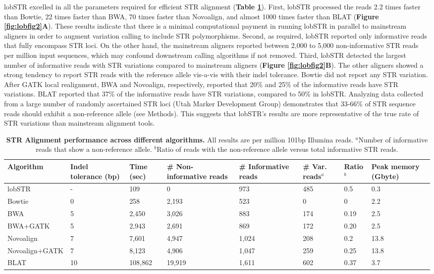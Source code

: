 lobSTR excelled in all the parameters required for efficient STR alignment (\textbf{Table \ref{tab:lobtab1}}). First, lobSTR processed the reads 2.2 times faster than Bowtie, 22 times faster than BWA, 70 times faster than Novoalign, and almost 1000 times faster than BLAT (\textbf{Figure \ref{fig:lobfig2}A}). These results indicate that there is a minimal computational payment in running lobSTR in parallel to mainstream aligners in order to augment variation calling to include STR polymorphisms. Second, as required, lobSTR reported only informative reads that fully encompass STR loci. On the other hand, the mainstream aligners reported between 2,000 to 5,000 non-informative STR reads per million input sequences, which may confound downstream calling algorithms if not removed. Third, lobSTR detected the largest number of informative reads with STR variations compared to mainstream aligners (\textbf{Figure \ref{fig:lobfig2}B}). The other aligners showed a strong tendency to report STR reads with the reference allele vis-a-vis with their indel tolerance. Bowtie did not report any STR variation. After GATK local realignment, BWA and Novoalign, respectively, reported that 20\% and 25\% of the informative reads have STR variations. BLAT reported that 37\% of the informative reads have STR variations, compared to 50\% in lobSTR. Analyzing data collected from a large number of randomly ascertained STR loci \cite{PayseurJingHaasl2011} (Utah Marker Development Group) demonstrates that 33-66\% of STR sequence reads should exhibit a non-reference allele (see Methods). This suggests that lobSTR's results are more representative of the true rate of STR variations than mainstream alignment tools.

\begin{table}[h!]
\centering
\label{tab:lobtab1}
\begin{adjustbox}{width=1\textwidth}
\begin{tabular}{l l l l l l l l}
\hline
Algorithm & Indel tolerance (bp) & Time (sec)& \# Non-informative reads & \# Informative reads & \# Var. reads$^a$	& Ratio$^b$ & Peak memory (Gbyte) \\
\hline
lobSTR & - & 109 & 0 & 973 & 485 & 0.5 & 0.3\\
Bowtie&0&258&2,193&523&0&0&2.2\\
BWA&5&2,450&3,026&883&174&0.19&2.5\\
BWA+GATK&5&2,943&2,691&869&172&0.20&2.5\\
Novoalign&7&7,601&4,947&1,024&208&0.2&13.8\\
Novoalign+GATK&7&8,123&4,906&1,047&259&0.25&13.8\\
BLAT&10&108,862&19,919&1,611&602&0.37&3.7\\
\hline
\end{tabular}
\end{adjustbox}
\caption{\textbf{STR Alignment performance across different algorithms.} All results are per million 101bp Illumina reads. $^a$Number of informative reads that show a non-reference allele. $^b$Ratio of reads with the non-reference allele versus total informative STR reads.}
\end{table}

